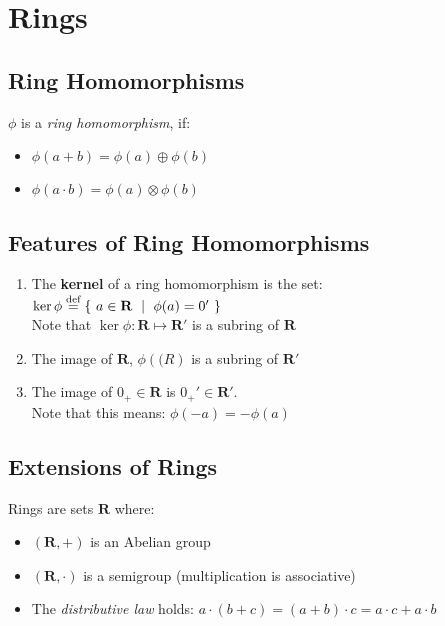 \documentclass{article}
\begin{document}
\section{Rings}

\subsection{Ring Homomorphisms}

$\phi$ is a \emph{ring homomorphism}, if:
\begin{itemize}
  \item $\phi(a+b)=\phi(a)\oplus\phi(b)$
  \item $\phi(a \cdot b)=\phi(a)\otimes\phi(b)$
\end{itemize}

\subsection{Features of Ring Homomorphisms}


\begin{enumerate}
  \item
    The \textbf{kernel} of a ring homomorphism is the set:\\
    $\ker \phi \stackrel{\text{def}}{=} \{\ a\in\mathbf{R}\ \mid\ \phi(a)=0'\ \}$ \\
    Note that $\ker\phi: \mathbf{R} \mapsto \mathbf{R'}$ is a subring of
    $\mathbf{R}$
  \item
    The image of $\mathbf{R}$, $\phi(\mathbf(R)$ is a subring of $\mathbf{R'}$
  \item
    The image of $0_+\in\mathbf{R}$ is $0_+'\in\mathbf{R'}$.\\
    Note that this means: $\phi(-a)=-\phi(a)$

\end{enumerate}


\subsection{Extensions of Rings}

{\noindent}Rings are sets $\mathbf{R}$ where:
\begin{itemize}
  \item $(\mathbf{R}, +)$ is an Abelian group
  \item $(\mathbf{R}, \cdot)$ is a semigroup (multiplication is associative)
  \item
    The \emph{distributive law} holds:
    $a \cdot (b + c) = (a + b) \cdot c = a \cdot c + a \cdot b$
\end{itemize}
\end{document}
